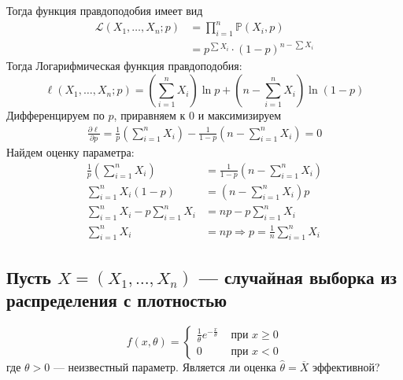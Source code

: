 \documentclass{article}
\begin{document}
Тогда функция правдоподобия имеет вид
\begin{equation*}
    \begin{aligned}
        \mathcal{L}(X_1,\ldots,X_n;p)&=\prod_{i=1}^{n}\mathbb{P}(X_i,p)\\
        &=p^{\textstyle \sum X_i}\cdot(1-p)^{n-\sum X_i}
    \end{aligned}
\end{equation*}
Тогда Логарифмическая функция правдоподобия:
\begin{equation*}
    \ell(X_1,\ldots,X_n;p)=\left(\sum_{i=1}^n X_i\right)\ln p+\left(n-\sum_{i=1}^nX_i\right)\ln(1-p)
\end{equation*}
Дифференцируем по $p$, приравняем к 0 и максимизируем
\begin{equation*}
    \begin{aligned}
        \frac{\partial \ell}{\partial p}=\frac{1}{p}\left(\sum_{i=1}^n X_i\right)-\frac{1}{1-p}\left(n-\sum_{i=1}^n X_i\right)=0
    \end{aligned}
\end{equation*}
Найдем оценку параметра:
\begin{equation*}
    \begin{aligned}
        \frac{1}{p}\left(\sum_{i=1}^n X_i\right)&=\frac{1}{1-p}\left(n-\sum_{i=1}^n X_i\right)\\
        \sum_{i=1}^n X_i(1-p)&=\left(n-\sum_{i=1}^n X_i\right)p\\
        \sum_{i=1}^n X_i-p\sum_{i=1}^n X_i&=np-p\sum_{i=1}^n X_i\\
        \sum_{i=1}^n X_i&=np\Longrightarrow p=\frac{1}{n}\sum_{i=1}^n X_i
    \end{aligned}
\end{equation*}

\subsection{Пусть $X=\left(X_{1}, \ldots, X_{n}\right)$ — случайная выборка из распределения с плотностью}
\begin{equation*}
    f(x, \theta)= \begin{cases}\frac{1}{\theta} e^{-\frac{x}{\theta}} & \text { при } x \geqslant 0 \\ 0 & \text { при } x<0\end{cases}
\end{equation*}
где $\theta>0$ — неизвестный параметр. Является ли оценка $\hat{\theta}=\overline{X}$ эффективной?
\end{document}
